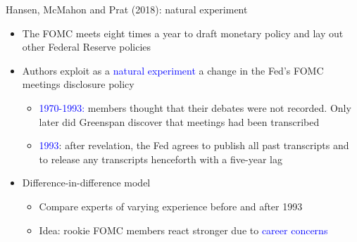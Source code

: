 \documentclass[english]{beamer}
\begin{document}
\begin{frame}{Hansen, McMahon and Prat (2018): natural experiment}
\begin{itemize}
\setlength{\itemsep}{1.5em}
\item The FOMC meets eight times a year to draft monetary policy and lay out other Federal Reserve policies
\item Authors exploit as a \textcolor{blue}{natural experiment} a change in the Fed's FOMC meetings disclosure policy
\vspace{4pt}
\begin{itemize}
\setlength{\itemsep}{0.4em}
\item \textcolor{blue}{1970-1993:} members thought that their debates were not recorded. Only later did Greenspan discover that meetings had been transcribed

    \item \textcolor{blue}{1993}: after revelation, the Fed agrees to publish all past transcripts and to release any transcripts henceforth with a five-year lag 

\end{itemize}
\item Difference-in-difference model
\begin{itemize}
    \item Compare experts of varying experience before and after 1993
    \item Idea: rookie FOMC members react stronger due to \textcolor{blue}{career concerns}
\end{itemize}
\end{itemize}
\end{frame}%
\end{document}
